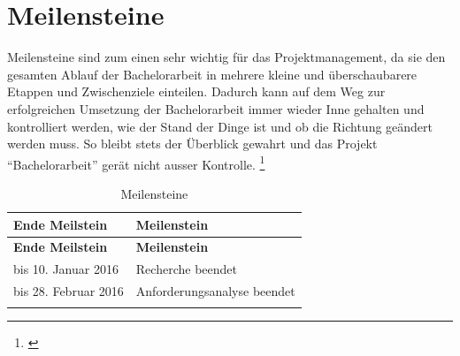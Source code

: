 \newpage

\section{Meilensteine}\label{meilensteine}

Meilensteine sind zum einen sehr wichtig für das Projektmanagement, da
sie den gesamten Ablauf der Bachelorarbeit in mehrere kleine und
überschaubarere Etappen und Zwischenziele einteilen. Dadurch kann auf
dem Weg zur erfolgreichen Umsetzung der Bachelorarbeit immer wieder Inne
gehalten und kontrolliert werden, wie der Stand der Dinge ist und ob die
Richtung geändert werden muss. So bleibt stets der Überblick gewahrt und
das Projekt ``Bachelorarbeit'' gerät nicht ausser Kontrolle. \footnote{\autocite{meilensteine}}

\begin{longtable}[c]{@{}ll@{}}
\caption{Meilensteine}\tabularnewline
\toprule
\begin{minipage}[b]{0.37\columnwidth}\raggedright\strut
\textbf{Ende Meilstein}
\strut\end{minipage} &
\begin{minipage}[b]{0.26\columnwidth}\raggedright\strut
\textbf{Meilenstein}
\strut\end{minipage}\tabularnewline
\midrule
\endfirsthead
\toprule
\begin{minipage}[b]{0.37\columnwidth}\raggedright\strut
\textbf{Ende Meilstein}
\strut\end{minipage} &
\begin{minipage}[b]{0.26\columnwidth}\raggedright\strut
\textbf{Meilenstein}
\strut\end{minipage}\tabularnewline
\midrule
\endhead
\begin{minipage}[t]{0.37\columnwidth}\raggedright\strut
bis 10. Januar 2016
\strut\end{minipage} &
\begin{minipage}[t]{0.26\columnwidth}\raggedright\strut
Recherche beendet
\strut\end{minipage}\tabularnewline
\begin{minipage}[t]{0.37\columnwidth}\raggedright\strut
bis 28. Februar 2016
\strut\end{minipage} &
\begin{minipage}[t]{0.26\columnwidth}\raggedright\strut
Anforderungsanalyse beendet
\strut\end{minipage}\tabularnewline
\begin{minipage}[t]{0.37\columnwidth}\raggedright\strut

\end{minipage}
\end{longtable}
